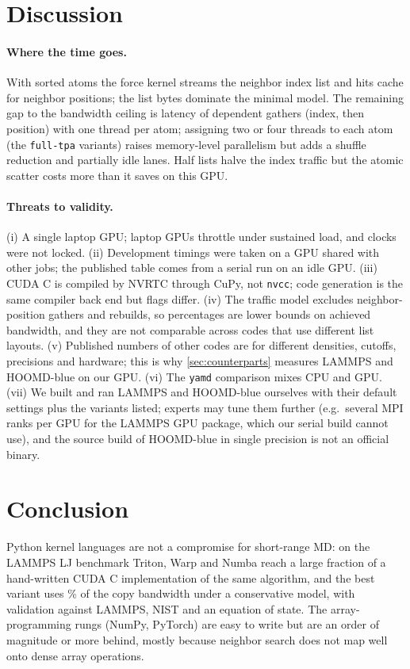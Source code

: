 \documentclass[11pt]{article}
\newcommand{\yamd}{\texttt{yamd}}
\begin{document}
\section{Discussion}
\paragraph{Where the time goes.} With sorted atoms the force kernel streams the neighbor index
list and hits cache for neighbor positions; the list bytes dominate the minimal model. The
remaining gap to the bandwidth ceiling is latency of dependent gathers (index, then position)
with one thread per atom; assigning two or four threads to each atom (the \texttt{full-tpa}
variants) raises memory-level parallelism but adds a shuffle reduction and partially idle lanes. Half lists halve the
index traffic but the atomic scatter costs more than it saves on this GPU.

\paragraph{Threats to validity.} (i) A single laptop GPU; laptop GPUs throttle under sustained
load, and clocks were not locked. (ii) Development timings were taken on a GPU shared with
other jobs; the published table comes from a serial run on an idle GPU. (iii) CUDA C is compiled by NVRTC through CuPy,
not \texttt{nvcc}; code generation is the same compiler back end but flags differ.
(iv) The traffic model excludes neighbor-position gathers and rebuilds, so percentages are
lower bounds on achieved bandwidth, and they are not comparable across codes that use
different list layouts. (v) Published numbers of other codes are for different densities,
cutoffs, precisions and hardware; this is why \cref{sec:counterparts} measures LAMMPS and
HOOMD-blue on our GPU. (vi) The \yamd{} comparison mixes CPU and GPU. (vii) We built and ran
LAMMPS and HOOMD-blue ourselves with their default settings plus the variants listed; experts
may tune them further (e.g.\ several MPI ranks per GPU for the LAMMPS GPU package, which our
serial build cannot use), and the source build of HOOMD-blue in single precision is not an
official binary.

\section{Conclusion}
Python kernel languages are not a compromise for short-range MD: on the LAMMPS LJ benchmark
Triton, Warp and Numba reach a large fraction of a hand-written CUDA C implementation of the
same algorithm, and the best variant uses \bestPctCopy\% of the copy bandwidth under a
conservative model, with validation against LAMMPS, NIST and an equation of state. The
array-programming rungs (NumPy, PyTorch) are easy to write but are an order of magnitude or
more behind, mostly because neighbor search does not map well onto dense array operations.
\end{document}
